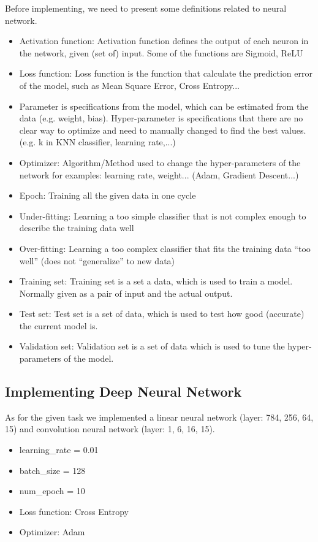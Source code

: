 \documentclass[11pt]{article}
\begin{document}
Before implementing, we need to present some definitions related to neural network.
\begin{itemize}
    \item Activation function: Activation function defines the output of each neuron in the network, given (set of) input. Some of the functions are Sigmoid, ReLU
    \item Loss function: Loss function is the function that calculate the prediction error of the model, such as Mean Square Error, Cross Entropy...
    \item Parameter is specifications from the model, which can be estimated from the data (e.g. weight, bias). Hyper-parameter is specifications that there are no clear way to optimize and need to manually changed to find the best values. (e.g. k in KNN classifier, learning rate,...)
    \item Optimizer: Algorithm/Method used to change the hyper-parameters of the network for examples: learning rate, weight... (Adam, Gradient Descent...)
    \item Epoch: Training all the given data in one cycle
    \item Under-fitting: Learning a too simple classifier that is not complex enough to describe the training data well
    \item Over-fitting: Learning a too complex classifier that fits the training data “too well” (does not “generalize” to new data)
    \item Training set: Training set is a set a data, which is used to train a model. Normally given as a pair of input and the actual output.
    \item Test set: Test set is a set of data, which is used to test how good (accurate) the current model is.
    \item Validation set: Validation set is a set of data which is used to tune the hyper-parameters of the model.
\end{itemize}

\subsection{Implementing Deep Neural Network}

As for the given task we implemented a linear neural network (layer: 784, 256, 64, 15) and convolution neural network (layer: 1, 6, 16, 15).

\begin{itemize}
    \item learning\_rate = 0.01
    \item batch\_size = 128
    \item num\_epoch = 10
    \item Loss function: Cross Entropy
    \item Optimizer: Adam
\end{itemize}
\end{document}
